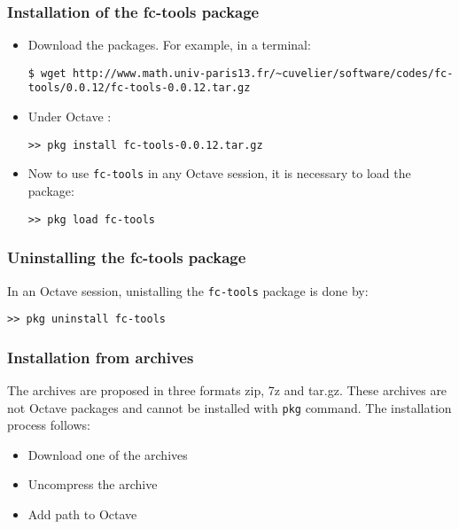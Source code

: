 \subsubsection{Installation of the fc-tools package}

\begin{itemize}
\item Download the packages. For example, in a terminal:
\begin{verbatim}
$ wget http://www.math.univ-paris13.fr/~cuvelier/software/codes/fc-tools/0.0.12/fc-tools-0.0.12.tar.gz
\end{verbatim}
\item Under Octave :
\begin{verbatim}
>> pkg install fc-tools-0.0.12.tar.gz
\end{verbatim}
\item Now to use \texttt{fc-tools} in any Octave session, it is necessary to load the package:
\begin{verbatim}
>> pkg load fc-tools
\end{verbatim}
\end{itemize}

\subsubsection{Uninstalling the fc-tools package}
In an Octave session, unistalling the \texttt{fc-tools} package is done by:
\begin{verbatim}
>> pkg uninstall fc-tools
\end{verbatim}

\subsubsection{Installation from archives}
The archives are proposed in three formats zip, 7z and tar.gz. These archives are not Octave packages and cannot be installed with \texttt{pkg} command.
The installation process follows:
\begin{itemize}
\item Download one of the archives
\item Uncompress the archive
\item Add path to Octave
\end{itemize}


